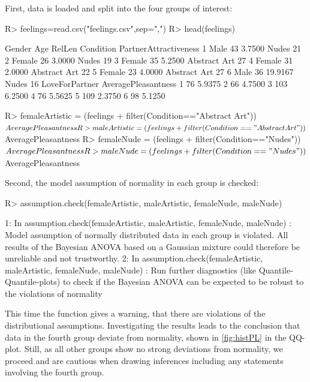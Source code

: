 First, data is loaded and split into the four groups of interest:
\begin{example}
R> feelings=read.csv("feelings.csv",sep=",")
R> head(feelings)

  Gender Age  RelLen    Condition PartnerAttractiveness
1   Male  43  3.7500        Nudes                    21
2 Female  26  3.0000        Nudes                    19
3 Female  35  5.2500 Abstract Art                    27
4 Female  31  2.0000 Abstract Art                    22
5 Female  23  4.0000 Abstract Art                    27
6   Male  36 19.9167        Nudes                    16
  LoveForPartner AveragePleasantness
1             76              5.9375
2             66              4.7500
3            103              6.2500
4             76              5.5625
5            109              2.3750
6             98              5.1250

R> femaleArtistic = (feelings %
+  filter(Condition=="Abstract Art"))$AveragePleasantness
R> maleArtistic = (feelings %
+  filter(Condition=="Abstract Art"))$AveragePleasantness
R> femaleNude = (feelings %
+  filter(Condition=="Nudes"))$AveragePleasantness
R> maleNude = (feelings %
+  filter(Condition=="Nudes"))$AveragePleasantness
\end{example}
Second, the model assumption of normality in each group is checked:
\begin{example}
R> assumption.check(femaleArtistic, maleArtistic, femaleNude, maleNude)

1: In assumption.check(femaleArtistic, maleArtistic, femaleNude, maleNude) :
  Model assumption of normally distributed data in each group is violated.
 All results of the Bayesian ANOVA based on a Gaussian mixture 
 could therefore be unreliable and not trustworthy.
2: In assumption.check(femaleArtistic, maleArtistic, femaleNude, maleNude) :
  Run further diagnostics (like Quantile-Quantile-plots) to check if the 
  Bayesian ANOVA can be expected to be robust to the violations of normality	
\end{example}
This time the function gives a warning, that there are violations of the distributional assumptions. Investigating the results leads to the conclusion that data in the fourth group deviate from normality, shown in  \ref{fig:histPL} in the QQ-plot. Still, as all other groups show no strong deviations from normality, we proceed and are cautious when drawing inferences including any statements involving the fourth group.
